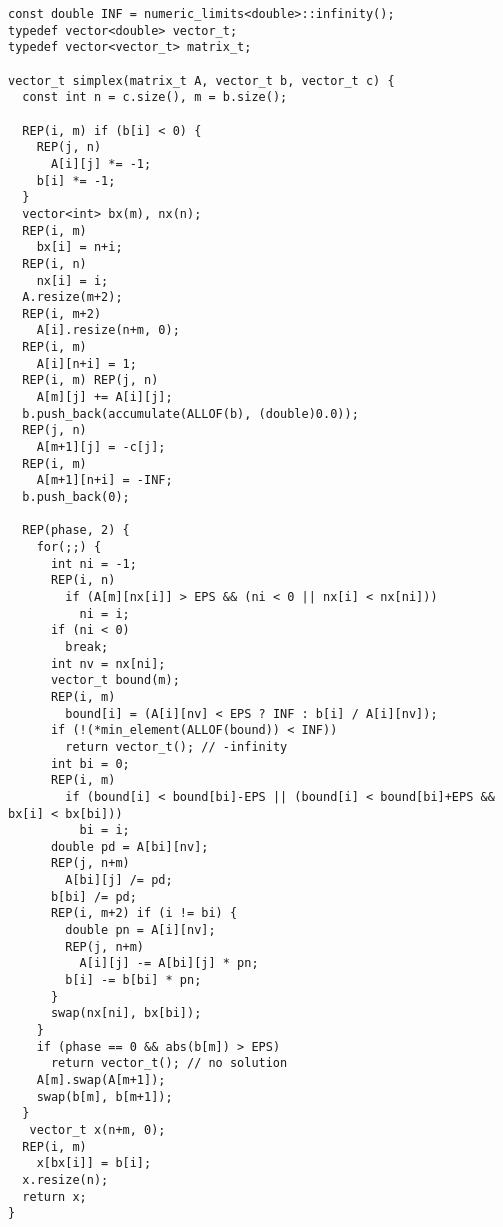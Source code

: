 \begin{lstlisting}
const double INF = numeric_limits<double>::infinity();
typedef vector<double> vector_t;
typedef vector<vector_t> matrix_t;

vector_t simplex(matrix_t A, vector_t b, vector_t c) {
  const int n = c.size(), m = b.size();
 
  REP(i, m) if (b[i] < 0) {
    REP(j, n)
      A[i][j] *= -1;
    b[i] *= -1;
  }
  vector<int> bx(m), nx(n);
  REP(i, m)
    bx[i] = n+i;
  REP(i, n)
    nx[i] = i;
  A.resize(m+2);
  REP(i, m+2)
    A[i].resize(n+m, 0);
  REP(i, m)
    A[i][n+i] = 1;
  REP(i, m) REP(j, n)
    A[m][j] += A[i][j];
  b.push_back(accumulate(ALLOF(b), (double)0.0));
  REP(j, n)
    A[m+1][j] = -c[j];
  REP(i, m)
    A[m+1][n+i] = -INF;
  b.push_back(0);

  REP(phase, 2) {
    for(;;) {
      int ni = -1;
      REP(i, n)
        if (A[m][nx[i]] > EPS && (ni < 0 || nx[i] < nx[ni]))
          ni = i;
      if (ni < 0)
        break;
      int nv = nx[ni];
      vector_t bound(m);
      REP(i, m)
        bound[i] = (A[i][nv] < EPS ? INF : b[i] / A[i][nv]);
      if (!(*min_element(ALLOF(bound)) < INF))
        return vector_t(); // -infinity
      int bi = 0;
      REP(i, m)
        if (bound[i] < bound[bi]-EPS || (bound[i] < bound[bi]+EPS && bx[i] < bx[bi]))
          bi = i;
      double pd = A[bi][nv];
      REP(j, n+m)
        A[bi][j] /= pd;
      b[bi] /= pd;
      REP(i, m+2) if (i != bi) {
        double pn = A[i][nv];
        REP(j, n+m)
          A[i][j] -= A[bi][j] * pn;
        b[i] -= b[bi] * pn;
      }
      swap(nx[ni], bx[bi]);
    }
    if (phase == 0 && abs(b[m]) > EPS)
      return vector_t(); // no solution
    A[m].swap(A[m+1]);
    swap(b[m], b[m+1]);
  }
   vector_t x(n+m, 0);
  REP(i, m)
    x[bx[i]] = b[i];
  x.resize(n);
  return x;
}
\end{lstlisting}

\newpage
